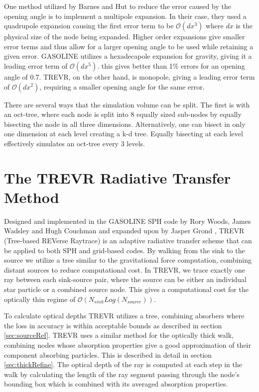 One method utilized by Barnes and Hut to reduce the error caused by the opening angle is to implement a multipole expansion. In their case, they used a quadrupole expansion causing the first error term to be $\mathcal{O}(dx^3)$ where $dx$ is the physical size of the node being expanded. Higher order expansions give smaller error terms and thus allow for a larger opening angle to be used while retaining a given error. GASOLINE utilizes a hexadecapole expansion for gravity, giving it a leading error term of $\mathcal{O}(dx^5)$. this gives better than 1\% errors for an opening angle of 0.7. TREVR, on the other hand, is monopole, giving a leading error term of $\mathcal{O}(dx^2)$, requiring a smaller opening angle for the same error.

There are several ways that the simulation volume can be split. The first is with an oct-tree, where each node is split into 8 equally sized sub-nodes by equally bisecting the node in all three dimensions. Alternatively, one can bisect in only one dimension at each level creating a k-d tree. Equally bisecting at each level effectively simulates an oct-tree every 3 levels.

\section{The TREVR Radiative Transfer Method}

Designed and implemented in the GASOLINE SPH code by Rory Woods, James Wadsley and Hugh Couchman \citep{rory} and expanded upon by Jasper Grond \citep{grond}, TREVR (Tree-based REVerse Raytrace) is an adaptive radiative transfer scheme that can be applied to both SPH and grid-based codes. By walking from the sink to the source we utilize a tree similar to the gravitational force computation, combining distant sources to reduce computational cost. In TREVR, we trace exactly one ray between each sink-source pair, where the source can be either an individual star particle or a combined source node. This gives a computational cost for the optically thin regime of $\mathcal{O}(N_{sink}Log(N_{source}))$.

To calculate optical depths TREVR utilizes a tree, combining absorbers where the loss in accuracy is within acceptable bounds as described in section \ref{sec:sourceRef}. TREVR uses a similar method for the optically thick walk, combining nodes whose absorption properties give a good approximation of their component absorbing particles. This is described in detail in section \ref{sec:thickRefine}. The optical depth of the ray is computed at each step in the walk by calculating the length of the ray segment passing through the node's bounding box which is combined with its averaged absorption properties.

